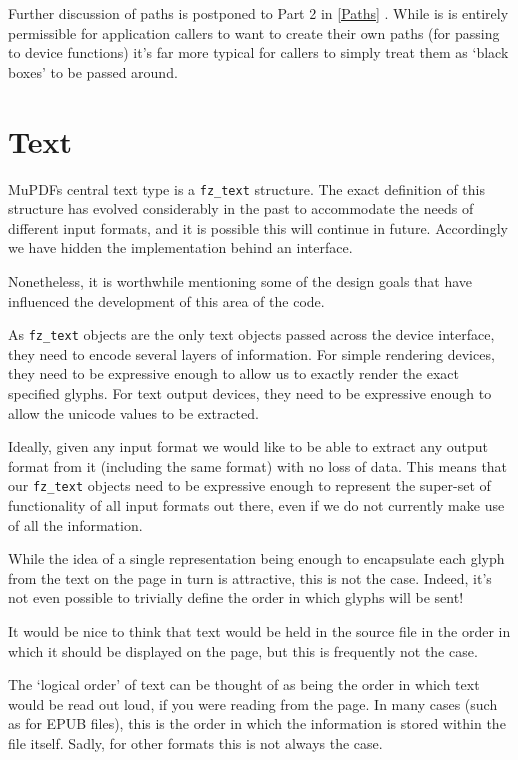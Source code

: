 \documentclass[oneside]{book}
\newcommand{\rjwref}[1] {\autoref{#1} \nameref{#1}}
\begin{document}
Further discussion of paths is postponed to Part 2 in \rjwref{Paths}. While is is entirely permissible for application callers to want to create their own paths (for passing to device functions) it's far more typical for callers to simply treat them as `black boxes' to be passed around.

\section{Text}
\label{TextOverview}

MuPDFs central text type is a \texttt{fz\_text} structure. The exact definition of this structure has evolved considerably in the past to accommodate the needs of different input formats, and it is possible this will continue in future. Accordingly we have hidden the implementation behind an interface.

Nonetheless, it is worthwhile mentioning some of the design goals that have influenced the development of this area of the code.

As \texttt{fz\_text} objects are the only text objects passed across the device interface, they need to encode several layers of information. For simple rendering devices, they need to be expressive enough to allow us to exactly render the exact specified glyphs. For text output devices, they need to be expressive enough to allow the unicode values to be extracted.

Ideally, given any input format we would like to be able to extract any output format from it (including the same format) with no loss of data. This means that our \texttt{fz\_text} objects need to be expressive enough to represent the super-set of functionality of all input formats out there, even if we do not currently make use of all the information.

While the idea of a single representation being enough to encapsulate each glyph from the text on the page in turn is attractive, this is not the case. Indeed, it's not even possible to trivially define the order in which glyphs will be sent!

It would be nice to think that text would be held in the source file in the order in which it should be displayed on the page, but this is frequently not the case.

The `logical order' of text can be thought of as being the order in which text would be read out loud, if you were reading from the page. In many cases (such as for EPUB files), this is the order in which the information is stored within the file itself. Sadly, for other formats this is not always the case.
\end{document}

